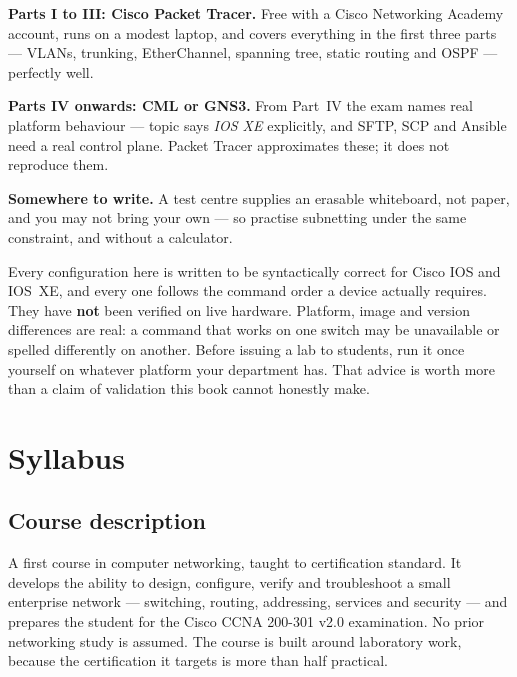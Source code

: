 \begin{tight}
  \item \textbf{Parts I to III: Cisco Packet Tracer.} Free with a Cisco
        Networking Academy account, runs on a modest laptop, and covers
        everything in the first three parts --- VLANs, trunking, EtherChannel,
        spanning tree, static routing and OSPF --- perfectly well.
  \item \textbf{Parts IV onwards: CML or GNS3.} From Part~IV the exam names real
        platform behaviour --- topic  says \emph{IOS XE} explicitly, and
        SFTP, SCP and Ansible need a real control plane. Packet Tracer
        approximates these; it does not reproduce them.
  \item \textbf{Somewhere to write.} A test centre supplies an erasable
        whiteboard, not paper, and you may not bring your own --- so practise
        subnetting under the same constraint, and without a calculator.
\end{tight}

\begin{alertbox}
Every configuration here is written to be syntactically correct for Cisco IOS
and IOS~XE, and every one follows the command order a device actually requires.
They have \textbf{not} been verified on live hardware. Platform, image and
version differences are real: a command that works on one switch may be
unavailable or spelled differently on another. Before issuing a lab to students,
run it once yourself on whatever platform your department has. That advice is
worth more than a claim of validation this book cannot honestly make.
\end{alertbox}

\chapter*{Syllabus}

\section*{Course description}

A first course in computer networking, taught to certification standard. It
develops the ability to design, configure, verify and troubleshoot a small
enterprise network --- switching, routing, addressing, services and security ---
and prepares the student for the Cisco CCNA 200-301 v2.0 examination. No prior
networking study is assumed. The course is built around laboratory work, because
the certification it targets is more than half practical.

